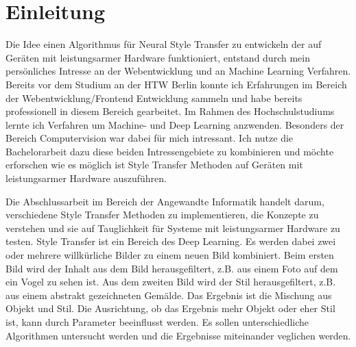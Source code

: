 \chapter*{Einleitung}

Die Idee einen Algorithmus für Neural Style Transfer zu entwickeln der auf Geräten mit leistungsarmer Hardware funktioniert, entstand durch mein persönliches 
Intresse an der Webentwicklung und an Machine Learning Verfahren. Bereits vor dem Studium an der HTW Berlin konnte ich Erfahrungen im Bereich der Webentwicklung/Frontend Entwicklung sammeln und habe bereits professionell in diesem Bereich gearbeitet. Im Rahmen des Hochschulstudiums lernte ich
Verfahren um Machine- und Deep Learning anzwenden. Besonders der Bereich Computervision war dabei für mich intressant. Ich nutze die Bachelorarbeit dazu diese beiden Intressengebiete zu kombinieren und möchte erforschen wie es möglich ist Style Transfer Methoden auf Geräten mit leistungsarmer Hardware auszuführen.

Die Abschlussarbeit im Bereich der Angewandte Informatik handelt darum, verschiedene Style Transfer Methoden zu implementieren, die Konzepte zu verstehen und sie auf Tauglichkeit für Systeme mit leistungsarmer Hardware zu testen. Style Transfer ist ein Bereich des Deep Learning. Es werden dabei zwei oder mehrere willkürliche Bilder zu einem neuen Bild kombiniert. Beim ersten Bild wird der Inhalt aus dem Bild herausgefiltert, z.B. aus einem Foto auf dem ein Vogel zu sehen ist. Aus dem zweiten Bild wird der Stil herausgefiltert, z.B. aus einem abstrakt gezeichneten Gemälde. Das Ergebnis ist die Mischung aus Objekt und Stil. Die Ausrichtung, ob das Ergebnis mehr Objekt oder eher Stil ist, kann durch Parameter beeinflusst werden. Es sollen unterschiedliche Algorithmen untersucht werden und die Ergebnisse miteinander veglichen werden.